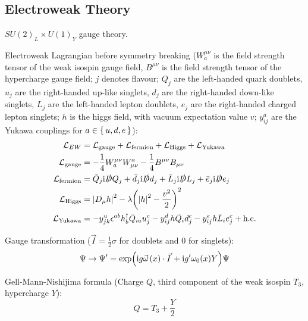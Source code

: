 	\subsection{Electroweak Theory}
		$SU(2)_L \times U(1)_Y$ gauge theory.

		Electroweak Lagrangian before symmetry breaking ($W_a^{\mu\nu}$ is the field strength tensor of the weak isospin gauge field, $B^{\mu\nu}$ is the field strength tensor of the hypercharge gauge field; $j$ denotes flavour; $Q_j$ are the left-handed quark doublets, $u_j$ are the right-handed up-like singlets, $d_j$ are the right-handed down-like singlets, $L_j$ are the left-handed lepton doublets, $e_j$ are the right-handed charged lepton singlets; $h$ is the higgs field, with vacuum expectation value $v$; $y^a_{ij}$ are the Yukawa couplings for $a \in \set{u,d,e}$):
		\begin{equation}
			\begin{aligned}
				\mathcal{L}_{EW} &= \mathcal{L}_{\text{gauge}} + \mathcal{L}_{\text{fermion}} + \mathcal{L}_{\text{Higgs}} + \mathcal{L}_{\text{Yukawa}} \\
				\mathcal{L}_{\text{gauge}} &= -\frac{1}{4} W_a^{\mu\nu} W^a_{\mu\nu} -\frac{1}{4} B^{\mu\nu} B_{\mu\nu} \\
				\mathcal{L}_{\text{fermion}} &= \bar{Q}_j \mathrm{i} \slashed{D} Q_j + \bar{d}_j \mathrm{i} \slashed{D} d_j + \bar{L}_j \mathrm{i} \slashed{D} L_j + \bar{e}_j \mathrm{i} \slashed{D} e_j \\
				\mathcal{L}_{\text{Higgs}} &= \abs{D_\mu h}^2 - \lambda\qty(\abs{h}^2 -\frac{v^2}{2})^2 \\
				\mathcal{L}_{\text{Yukawa}} &= - y^u_{jk} \epsilon^{ab} h^\dagger_b \bar{Q}_{ia}  u_j^c - y^d_{ij} h \bar{Q}_i d_j^c - y^e_{ij} h \bar{L}_i e_j^c + \text{h.c.}
			\end{aligned}
		\end{equation}

		\noindent
		Gauge transformation ($\vec{I}=\frac{1}{2}\sigma$ for doublets and $0$ for singlets):
		\begin{equation}
			\Psi \rightarrow \Psi' = \exp(\i g \vec{\omega}(x)\cdot\vec{I}	+ \i g' \omega_0(x) Y) \Psi
		\end{equation}

		\noindent
		Gell-Mann-Nishijima formula (Charge $Q$, third component of the weak isospin $T_3$, hypercharge $Y$):
		\begin{equation}
			Q = T_3 + \frac{Y}{2}
		\end{equation}

